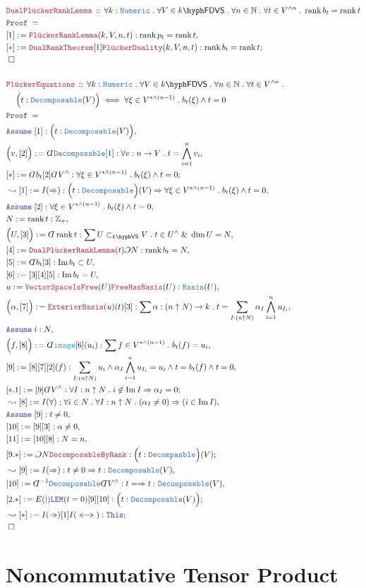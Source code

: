 \documentclass[12pt]{scrartcl}%
\newcommand{\TYPE}[1]{\textcolor{NavyBlue}{\mathtt{#1}}}%
\newcommand{\FUNC}[1]{\textcolor{Cerulean}{\mathtt{#1}}}%
\newcommand{\LOGIC}[1]{\textcolor{Blue}{\mathtt{#1}}}%
\newcommand{\THM}[1]{\textcolor{Maroon}{\mathtt{#1}}}%
\renewcommand{\.}{\; . \;} %
\newcommand{\de}{: \kern 0.1pc =} %
\newcommand{\Theorem}[2]{& \THM{#1} \, :: \, #2 \\ & \Proof = \\ } %
\newcommand{\NewLine}{\\ & \kern 1pc}%
\newcommand{\Page}[1]{ \begin{align*} #1 \end{align*}  }%
\newcommand{ \bd }{ \ByDef }%
\renewcommand{\And}{\; \& \;}%
\newcommand{\Int}{\mathbb{Z}}%
\newcommand{\Nat}{\mathbb{N}}%
\DeclareMathOperator*{\im}{Im}%
\newcommand{\Imply}{\Rightarrow}
\newcommand{\Say}[3]{& #1 \de #2 : #3, \\} %
\newcommand{\Conclude}[3]{& #1 \de #2 : #3; \\}%
\newcommand{\Derive}[3]{& \leadsto #1 \de #2 : #3, \\} %
\newcommand{\DeriveConclude}[3]{& \leadsto #1 \de #2 : #3 ; \\} %
\newcommand{\Assume}[2]{& \LOGIC{Assume} \; #1 : #2, \\} %
\newcommand{\QED}{\; \square} %
\newcommand{\EndProof}{& \QED \\} %
\newcommand{\ByDef}{\rotatebox[origin=c]{-180}{$D$}}%
\newcommand{\ByConstr}{\rotatebox[origin=c]{-180}{$C$}}%
\newcommand{\Proof}{\LOGIC{Proof} \; } %
\DeclareMathOperator{\rank}{rank} %
\newcommand{\Basis}{\TYPE{Basis}} %
\newcommand{\subvec}[1]{\subset_{\VS{#1}}}%
\newcommand{\VS}[1]{#1\hyph\mathsf{VS}} %
\newcommand{\FDVS}[1]{#1\hyph\mathsf{FDVS}} %
\begin{document}
\Page{
	\Theorem{DualPl\ddot{u}ckerRankLemma}
	{
		\forall k : \TYPE{Numeric} \.
		\forall V \in \FDVS{k} \.
		\forall n \in \Nat \.
		\forall t \in V^{\wedge n} \.
		\rank b_t = \rank t
	}
	\Say{[1]}{\THM{Pl\ddot{u}ckerRankLemma}(k,V,n,t)}
	{
		\rank p_t = \rank t
	}
	\Conclude{[*]}
	{     
		\THM{DualRankTheorem}[1]
		\THM{Pl\ddot{u}ckerDuality}(k,V,n,t)
	}
	{
		\rank b_t = \rank t
	}
	\EndProof
	\\
	\Theorem{Pl\ddot{u}ckerEquations}
	{
		\forall k : \TYPE{Numeric} \.
		\forall V \in \FDVS{k} \.
		\forall n \in \Nat \.
		\forall t \in V^{\wedge n} \.
		\NewLine
		\Big(t : \TYPE{Decomposable}(V)\Big) 
		\iff
		\forall 
		\xi \in  V^{*\wedge (n-1)}  \.
		b_t(\xi) \wedge t = 0
	}
	\Assume{[1]}{ \Big( t : \TYPE{Decomposable}(V) \Big)  }
	\Say{\Big(v,[2]\Big)}
	{
		\bd \TYPE{Decomposable}[1]
	}
	{
		\forall v : n \to V \.
		t = \bigwedge^n_{i=1} v_i
	}
	\Conclude{[*]}{\bd b_t [2] \bd V^\wedge}
	{
		\forall \xi \in V^{*\wedge (n-1)} \.
		b_t(\xi) \wedge t = 0
	}
	\Derive{[1]}{I(\Imply)}
	{
		\Big(t : \TYPE{Decomposable}\Big)(V) 
		\Imply
		\forall \xi \in V^{*\wedge(n-1)} \.
		b_t(\xi) \wedge t = 0
	}
	\Assume{[2]}
	{
		\forall \xi \in V^{*\wedge(n-1)} \.
		b_t(\xi) \wedge t = 0
	}
	\Say{N}{\rank t}{\Int_+}
	\Say{\Big( U, [3] \Big)}
	{
		\bd \rank t
	}
	{
		\sum U \subvec{k} V \.
		t \in U^\wedge 
		\And
		\dim U = N
	}
	\Say{[4]}{\THM{DualPl\ddot{u}ckerRankLemma}(t)\ByConstr N}
	{
		\rank b_t = N
	}
	\Say{[5]}{\bd b_t [3] }
	{
		\im b_t \subset U
	}
	\Say{[6]}
	{
		[3][4][5]
	}
	{
		\im b_t = U
	}
	\Say{u}{\THM{VectorSpaceIsFree}(U)\THM{FreeHasBasis}(U)}
	{
		\Basis(U)
	}
	\Say{\Big(\alpha,[7]\Big)}{\THM{ExteriorBasis}(u)(t)[3]}
	{
		\sum \alpha : (n \uparrow N) \to k \.
		t = \sum_{I : (n \uparrow N)} 
		\alpha_I \bigwedge^n_{i=1}  u_{I_i}
	}
	\Assume{i}{N}
	\Say{\Big(f,[8]\Big)}{
		\bd \FUNC{image}[6](u_i) 
	}
	{
		\sum f \in V^{*\wedge(n-1)} \. b_t(f) = u_i
	}
	\Say{[9]}{[8][7][2](f)}
	{ 
		\sum_{I : (n \uparrow N)}  
		u_i \wedge \alpha_I\bigwedge^n_{i=1} u_{I_i}     =
		u_i \wedge t = 
		b_t(f) \wedge t = 
		0
	}
	\Conclude{[*.1]}{[9]\bd V^\wedge}{
		\forall I : n \uparrow N \. 
		i \not \in \im I \Imply
		\alpha_I = 0                           
	}
	\Derive{[8]}
	{
		I(\forall)
	}
	{
		\forall i \in N \.
		\forall I : n \uparrow N \.
		(\alpha_I \neq 0) 
		\Imply
		( i \in \im I  )
	}
	\Assume{[9]}{ t \neq 0}
	\Say{[10]}{[9][3]}{\alpha \neq 0}
	\Say{[11]}{[10][8]}{N = n}
	\Conclude{[9.*]}{\ByConstr N \THM{DecomposableByRank}}
	{
		\Big( t : \TYPE{Decompasble}\Big)(V)
	}
	\Derive{[9]}{I(\Imply)}{t \neq 0 \Imply t :\TYPE{Decomposable}(V)}
	\Say{[10]}{\bd^{-1} \TYPE{Decomposable}\bd V^\wedge}
	{
		t = \Imply t : \TYPE{Decomposable}(V)
	}
	\Conclude{[2.*]}{E(|)\LOGIC{LEM}(t=0)[9][10]}
	{
		\Big( t : \TYPE{Decomposable}(V)\Big)
	}
	\DeriveConclude{[*]}{I(\Imply)[1]I(\iff)}
	{
		\LOGIC{This}
	}
	\EndProof
}
\newpage
\section{Noncommutative Tensor Product}
\end{document}
